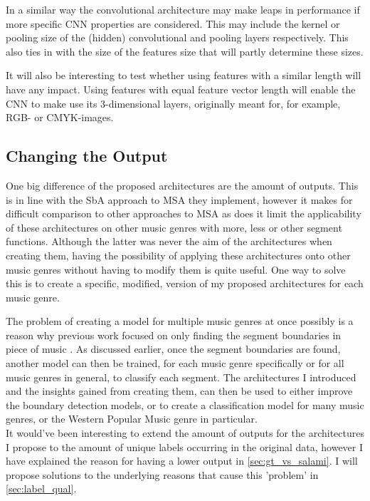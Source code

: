 In a similar way the convolutional architecture may make leaps in performance if more specific CNN properties are considered. This may include the kernel or pooling size of the (hidden) convolutional and pooling layers respectively. This also ties in with the size of the features size that will partly determine these sizes. 

It will also be interesting to test whether using features with a similar length will have any impact. Using features with equal feature vector length will enable the CNN to make use its 3-dimensional layers, originally meant for, for example, RGB- or CMYK-images.

\subsection{Changing the Output}
One big difference of the proposed architectures are the amount of outputs. This is in line with the SbA approach to MSA they implement, however it makes for difficult comparison to other approaches to MSA as does it limit the applicability of these architectures on other music genres with more, less or other segment functions. Although the latter was never the aim of the architectures when creating them, having the possibility of applying these architectures onto other music genres without having to modify them is quite useful. One way to solve this is to create a specific, modified, version of my proposed architectures for each music genre.

The problem of creating a model for multiple music genres at once possibly is a reason why previous work focused on only finding the segment boundaries in piece of music \cite{Grill2015structural}. As discussed earlier, once the segment boundaries are found, another model can then be trained, for each music genre specifically or for all music genres in general, to classify each segment. The architectures I introduced and the insights gained from creating them, can then be used to either improve the boundary detection models, or to create a classification model for many music genres, or the Western Popular Music genre in particular.\\

It would've been interesting to extend the amount of outputs for the architectures I propose to the amount of unique labels occurring in the original data, however I have explained the reason for having a lower output in \autoref{sec:gt_vs_salami}. I will propose solutions to the underlying reasons that cause this 'problem' in \autoref{sec:label_qual}.

